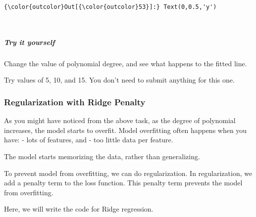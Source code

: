 \documentclass[11pt]{article}
\begin{document}
\begin{Verbatim}[commandchars=\\\{\}]
{\color{outcolor}Out[{\color{outcolor}53}]:} Text(0,0.5,'y')
\end{Verbatim}
            
    \begin{center}
    \end{center}
    { \hspace*{\fill} \\}
    
    \hypertarget{try-it-yourself}{%
\subparagraph{Try it yourself}\label{try-it-yourself}}

Change the value of polynomial degree, and see what happens to the
fitted line.

Try values of 5, 10, and 15. You don't need to submit anything for this
one.

    \hypertarget{regularization-with-ridge-penalty}{%
\subsubsection{Regularization with Ridge
Penalty}\label{regularization-with-ridge-penalty}}

As you might have noticed from the above task, as the degree of
polynomial increases, the model starts to overfit. Model overfitting
often happens when you have: - lots of features, and - too little data
per feature.

The model starts memorizing the data, rather than generalizing.

To prevent model from overfitting, we can do regularization. In
regularization, we add a penalty term to the loss function. This penalty
term prevents the model from overfitting.

Here, we will write the code for Ridge regression.
\end{document}
